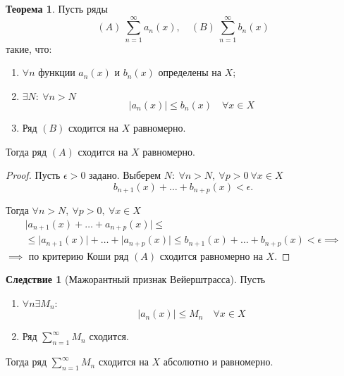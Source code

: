 \documentclass{report}
\theoremstyle{definition}
\newtheorem*{effect}{Следствие}
\newtheorem{theorem}{Теорема}[section]
\begin{document}
\begin{theorem}
  Пусть ряды
  \begin{equation*}
    (A) \ \sum_{n=1}^{\infty}a_n(x), \quad (B) \ \sum_{n=1}^{\infty}b_n(x)
  \end{equation*}
  такие, что:
  \begin{enumerate}
    \item $\forall n$ функции $a_n(x)$ и $b_n(x)$ определены на $X$;
    \item $\exists N: \ \forall n > N$
          \begin{equation*}
            \big|a_n(x)\big| \leqslant b_n(x) \quad \forall x \in X
          \end{equation*}
    \item Ряд $(B)$ сходится на $X$ равномерно.
  \end{enumerate}

  Тогда ряд $(A)$ сходится на $X$ равномерно.
\end{theorem}

\begin{proof}
  Пусть $\epsilon > 0$ задано. Выберем $N: \ \forall n > N, \ \forall p > 0 \ \forall x \in X$
  \begin{equation*}
    b_{n+1}(x) + \ldots + b_{n+p}(x) < \epsilon.
  \end{equation*}

  Тогда $\forall n > N, \ \forall p > 0, \ \forall x \in X$
  \begin{multline*}
    \big|a_{n+1}(x) + \ldots + a_{n+p}(x)\big| \leqslant \\
    \leqslant \big|a_{n+1}(x)\big| + \ldots + \big|a_{n+p}(x)\big| \leqslant b_{n+1}(x) + \ldots + b_{n+p}(x) < \epsilon \implies
  \end{multline*}
  $\implies$ по критерию Коши ряд $(A)$ сходится равномерно на $X$.
\end{proof}

\begin{effect}[Мажорантный признак Вейерштрасса]
  Пусть
  \begin{enumerate}
    \item $\forall n \exists M_n:$
    \begin{equation*}
      \big|a_n(x)\big| \leqslant M_n \quad \forall x \in X
    \end{equation*}
    \item Ряд $\sum_{n=1}^{\infty} M_n$ сходится.
  \end{enumerate}

  Тогда ряд $\sum_{n=1}^{\infty}M_n$ сходится на $X$ абсолютно и равномерно.
\end{effect}
\end{document}
